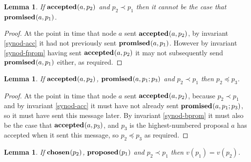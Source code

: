 \documentclass[journal]{IEEEtran}
\newtheorem{lemma}[theorem]{Lemma}
\begin{document}
\begin{lemma}\label{synod-acc-fprom}If $\mathbf{accepted}_{}(a,p_2)$ and $p_2 \prec p_1$ then
it cannot be the case that $\mathbf{promised}_{}(a,p_1)$.\end{lemma}

\begin{proof}At the point in time that node $a$ sent $\mathbf{accepted}_{}(a,p_2)$, by
invariant \ref{synod-acc} it had not previously sent $\mathbf{promised}_{}(a,p_1)$. However
by invariant \ref{synod-fprom} having sent $\mathbf{accepted}_{}(a,p_2)$ it may not
subsequently send $\mathbf{promised}_{}(a,p_1)$ either, as required.\end{proof}

\begin{lemma}\label{synod-acc-bprom}If $\mathbf{accepted}_{}(a,p_2)$, $\mathbf{promised}_{}(a,p_1;p_3)$
and $p_2 \prec p_1$ then $p_2 \preceq p_3$.\end{lemma}

\begin{proof}At the point in time that node $a$ sent $\mathbf{accepted}_{}(a,p_2)$, because
$p_2 \prec p_1$ and by invariant \ref{synod-acc} it must have not already sent
$\mathbf{promised}_{}(a,p_1;p_3)$, so it must have sent this message later. By invariant
\ref{synod-bprom} it must also be the case that $\mathbf{accepted}_{}(a,p_3)$, and $p_3$ is
the highest-numbered proposal $a$ has accepted when it sent this message, so
$p_2 \preceq p_3$ as required. \end{proof}

\begin{lemma}\label{synod-lemma} If $\mathbf{chosen}_{}(p_2)$, $\mathbf{proposed}_{}(p_1)$ and $p_2 \prec
p_1$ then $v(p_1) = v(p_2)$. \end{lemma}
\end{document}
